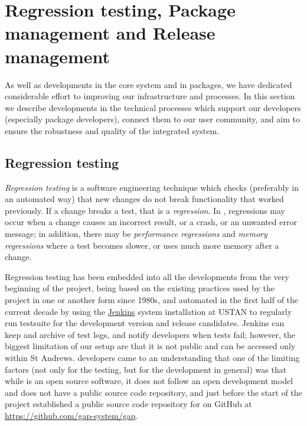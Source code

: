 \section{Regression testing, Package management and Release management}\label{gap-infra}

As well as developments in the core system and in packages, we have
dedicated considerable effort to improving our infrastructure and processes. 
In this section we describe developments in the technical processes
which support our developers (especially package developers),
connect them to our user community, and aim to 
ensure the robustness and quality of the integrated system.


\subsection{Regression testing}\label{testing}

\emph{Regression testing} is a software engineering technique which
checks (preferably in an automated way)
that new changes do not break functionality that 
worked previously. If a change breaks a test, that is 
a \emph{regression}. In \GAP, regressions may occur
when a change causes an incorrect result, or a crash, or an unwanted error
message; in addition, there may be \emph{performance regressions}
and \emph{memory regressions} where a test becomes slower, or uses
much more memory after a change.

Regression testing has been embedded into all the \GAP developments
from the very beginning of the project, being based on the existing
practices used by the \GAP project in one or another form since 1980s,
and automated in the first half of the current decade by 
using the \href{https://jenkins.io/}{\sf Jenkins} system installation
at USTAN to regularly run \GAP testsuite for the \GAP development 
version and release candidates.
{\sf Jenkins} can keep and archive of test logs, and notify
developers when tests fail; however, the biggest limitation of our setup are that
it is not public and can be accessed only within St Andrews. 
\GAP developers came to an understanding 
that one of the limiting factors (not only for the testing, but for
the \GAP development in general) was that while \GAP is an open source 
software, it does not follow an open development model and does not
have a public source code repository, and just before the start of
the project established a public source code repository for \GAP
on GitHub at \url{https://github.com/gap-system/gap}. 

